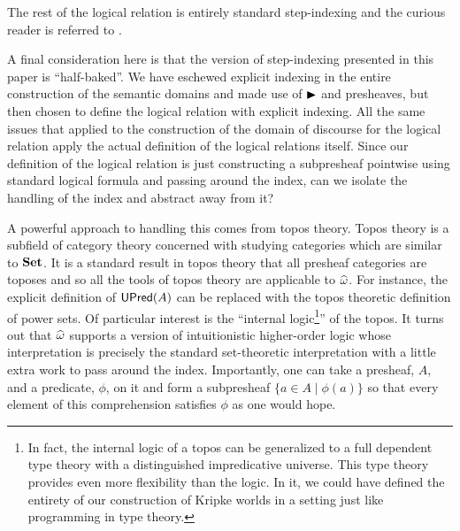 The rest of the logical relation is entirely standard step-indexing
and the curious reader is referred to \citet{Ahmed:04}.

A final consideration here is that the version of step-indexing
presented in this paper is ``half-baked''. We have eschewed explicit
indexing in the entire construction of the semantic domains and made
use of ${\blacktriangleright}$ and presheaves, but then chosen to define the logical
relation with explicit indexing. All the same issues that applied to
the construction of the domain of discourse for the logical relation
apply the actual definition of the logical relations itself. Since our
definition of the logical relation is just constructing a subpresheaf
pointwise using standard logical formula and passing around the index,
can we isolate the handling of the index and abstract away from it?

A powerful approach to handling this comes from topos theory. Topos
theory is a subfield of category theory concerned with studying
categories which are similar to $\mathbf{Set}$. It is a standard result in
topos theory that all presheaf categories are toposes and so all the
tools of topos theory are applicable to $\widehat{\omega}$. For
instance, the explicit definition of $\mathsf{UPred}(A)$ can be replaced with
the topos theoretic definition of power sets. Of particular interest
is the ``internal logic\footnote{In fact, the internal logic of a
  topos can be generalized to a full dependent type theory with a
  distinguished impredicative universe. This type theory provides even
  more flexibility than the logic. In it, we could have defined the
  entirety of our construction of Kripke worlds in a setting just like
  programming in type theory.}'' of the topos. It turns out that
$\widehat{\omega}$ supports a version of intuitionistic
higher-order logic whose interpretation is precisely the standard
set-theoretic interpretation with a little extra work to pass around
the index. Importantly, one can take a presheaf, $A$, and a predicate,
$\phi$, on it and form a subpresheaf $\{ a \in A \mid \phi(a) \}$ so
that every element of this comprehension satisfies $\phi$ as one would
hope.

